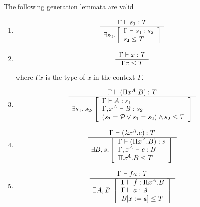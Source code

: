 \begin{theorem}
    \label{GenerationLemma}
    The following generation lemmata are valid
    \begin{enumerate}
    \item
        $$
        \begin{array}{c} 
            \Gamma \vdash s_1 : T
         \\ \hline 
            \exists
                s_2.
                \left[
                \begin{array}{l}
                    \Gamma \vdash s_1: s_2
                    \\
                    s_2 \le T
                \end{array}
                \right]
        \end{array}
        $$

    \item
        $$
        \begin{array}{c} 
            \Gamma \vdash x : T
         \\ \hline 
            \Gamma x \le T
        \end{array}
        $$
        where $\Gamma x$ is the type of $x$ in the context $\Gamma$.

    \item %
        $$
        \begin{array}{c} 
            \Gamma \vdash (\Pi x^A. B) : T
         \\ \hline 
            \exists
                s_1, s_2.
                \left[
                \begin{array}{l}
                    \Gamma \vdash A: s_1
                    \\
                    \Gamma, x^A \vdash B: s_2
                    \\
                    (s_2 = {\cal P} \lor s_1 = s_2) \land s_2 \le T
                \end{array}
                \right]
        \end{array}
        $$

    \item %
        $$
        \begin{array}{c} 
            \Gamma \vdash (\lambda x^A. e) : T
         \\ \hline 
            \exists
                B, s.
                \left[
                \begin{array}{l}
                    \Gamma \vdash (\Pi x^A. B): s
                    \\
                    \Gamma, x^A \vdash e: B
                    \\
                    \Pi x^A.B \le T
                \end{array}
                \right]
        \end{array}
        $$

    \item %
        $$
        \begin{array}{c} 
            \Gamma \vdash f a : T
         \\ \hline 
            \exists
                A, B.
                \left[
                \begin{array}{l}
                    \Gamma \vdash f: \Pi x^A. B
                    \\
                    \Gamma \vdash a: A
                    \\
                    B[x:=a] \le T
                \end{array}
                \right]
        \end{array}
        $$
    \end{enumerate}


\end{theorem}
